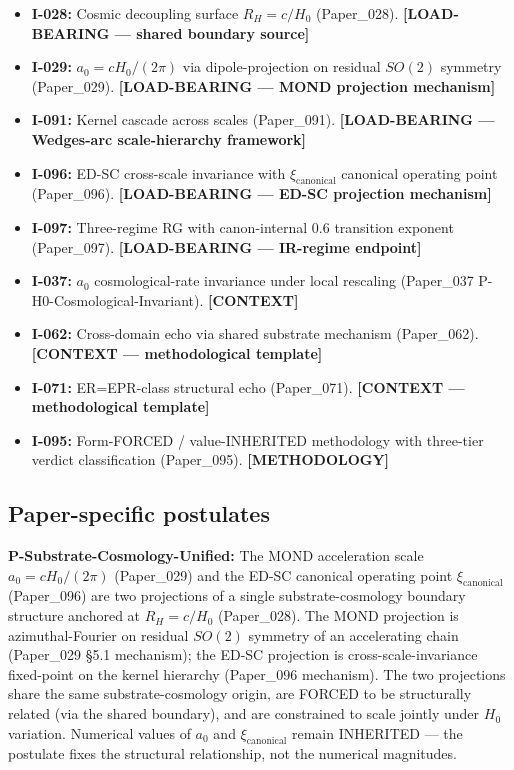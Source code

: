 \documentclass[11pt,a4paper]{article}
\begin{document}
\begin{itemize}[noitemsep]
\item \textbf{I-028:} Cosmic decoupling surface $R_H = c/H_0$ (Paper\_028). \textbf{[LOAD-BEARING --- shared boundary source]}
\item \textbf{I-029:} $a_0 = cH_0/(2\pi)$ via dipole-projection on residual $SO(2)$ symmetry (Paper\_029). \textbf{[LOAD-BEARING --- MOND projection mechanism]}
\item \textbf{I-091:} Kernel cascade across scales (Paper\_091). \textbf{[LOAD-BEARING --- Wedges-arc scale-hierarchy framework]}
\item \textbf{I-096:} ED-SC cross-scale invariance with $\xi_\mathrm{canonical}$ canonical operating point (Paper\_096). \textbf{[LOAD-BEARING --- ED-SC projection mechanism]}
\item \textbf{I-097:} Three-regime RG with canon-internal 0.6 transition exponent (Paper\_097). \textbf{[LOAD-BEARING --- IR-regime endpoint]}
\item \textbf{I-037:} $a_0$ cosmological-rate invariance under local rescaling (Paper\_037 P-H0-Cosmological-Invariant). \textbf{[CONTEXT]}
\item \textbf{I-062:} Cross-domain echo via shared substrate mechanism (Paper\_062). \textbf{[CONTEXT --- methodological template]}
\item \textbf{I-071:} ER=EPR-class structural echo (Paper\_071). \textbf{[CONTEXT --- methodological template]}
\item \textbf{I-095:} Form-FORCED / value-INHERITED methodology with three-tier verdict classification (Paper\_095). \textbf{[METHODOLOGY]}
\end{itemize}

\subsection{Paper-specific postulates}

\textbf{P-Substrate-Cosmology-Unified:} The MOND acceleration scale $a_0 = cH_0/(2\pi)$ (Paper\_029) and the ED-SC canonical operating point $\xi_\mathrm{canonical}$ (Paper\_096) are two projections of a single substrate-cosmology boundary structure anchored at $R_H = c/H_0$ (Paper\_028). The MOND projection is azimuthal-Fourier on residual $SO(2)$ symmetry of an accelerating chain (Paper\_029 \S5.1 mechanism); the ED-SC projection is cross-scale-invariance fixed-point on the kernel hierarchy (Paper\_096 mechanism). The two projections share the same substrate-cosmology origin, are FORCED to be structurally related (via the shared boundary), and are constrained to scale jointly under $H_0$ variation. Numerical values of $a_0$ and $\xi_\mathrm{canonical}$ remain INHERITED --- the postulate fixes the structural relationship, not the numerical magnitudes.
\end{document}
